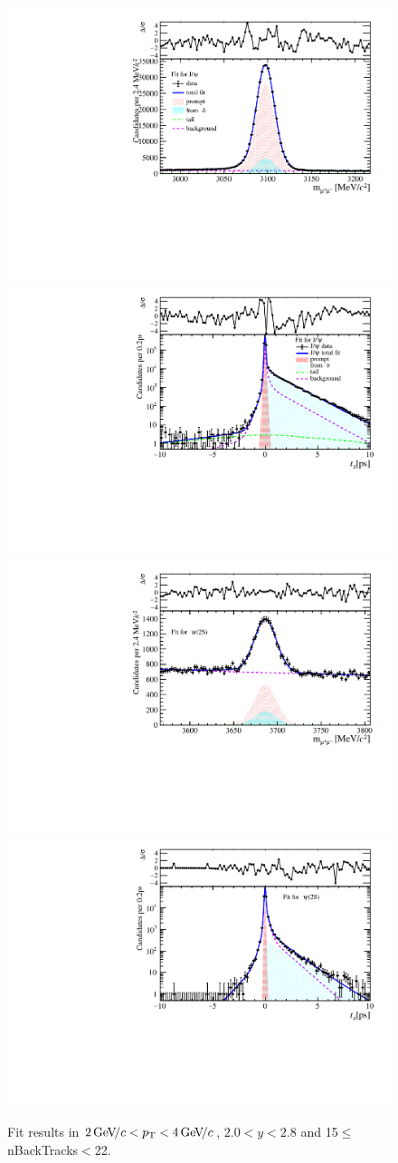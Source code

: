 \begin{figure}[H]
\begin{center}
\includegraphics[width=0.47\linewidth]{pdf/Jpsi/drawmassB/n3y1pt2.pdf}
\includegraphics[width=0.47\linewidth]{pdf/Jpsi/2DFitB/n3y1pt2.pdf}
\vspace*{-0.5cm}
\includegraphics[width=0.47\linewidth]{pdf/Psi2S/drawmassB/n3y1pt2.pdf}
\includegraphics[width=0.47\linewidth]{pdf/Psi2S/2DFitB/n3y1pt2.pdf}
\vspace*{-0.5cm}
\end{center}
\caption{Fit results in $2\text{\,Ge\kern -0.1em V\!/}c<p_{\mathrm{T}}<4\text{\,Ge\kern -0.1em V\!/}c$, $2.0<y<2.8$ and 15$\leq$nBackTracks$<$22.}
\label{Fitn3y1pt2}
\end{figure}
